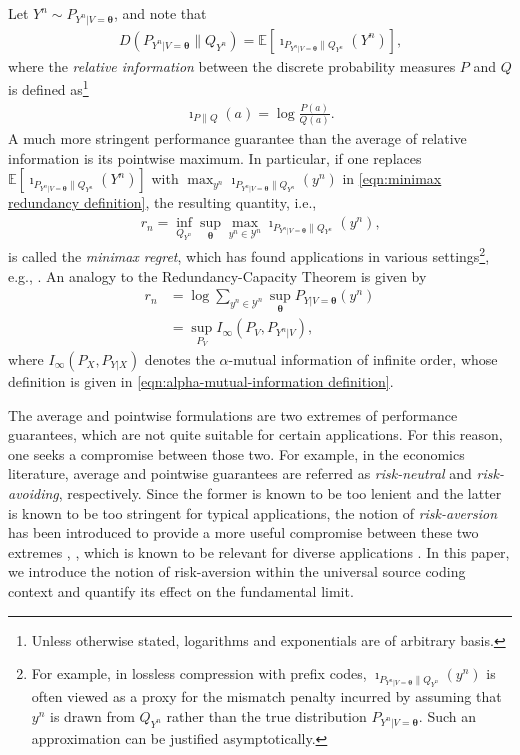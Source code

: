 \documentclass[journal, 10pt]{IEEEtran}
\newcommand{\bbE}{\mathbb{E}}
\newcommand{\cY}{\mathcal{Y}}
\theoremstyle{plain}
\theoremstyle{plain}
\theoremstyle{plain}
\theoremstyle{plain}
\newcommand{\boldtheta}{\mathbold{\theta}}
\begin{document}
Let $Y^n\sim P_{Y^n|V=\boldtheta}$, and note that
\begin{align}
	D(P_{Y^n|V=\boldtheta}\| Q_{Y^n} )=\bbE \left[\imath_{P_{Y^n|V=\boldtheta}\| Q_{Y^n} }(Y^n) \right]\text{,} 
\end{align}
where the \emph{relative information} between the discrete probability measures $P$ and $Q$ is defined as\footnote{Unless otherwise stated, logarithms and exponentials are of arbitrary basis.}
\begin{align}
\imath_{P\| Q }(a)=\log \frac{P(a)}{Q(a)}\text{.}
\end{align}
A much more stringent performance guarantee than the average of relative information is its pointwise maximum. In particular, if one replaces $\bbE[\imath_{P_{Y^n|V=\boldtheta}\| Q_{Y^n} }(Y^n) ]$ with $\max_{y^n} \imath_{P_{Y^n|V=\boldtheta}\| Q_{Y^n} }(y^n) $ in \eqref{eqn:minimax redundancy definition}, the resulting quantity, i.e.,
\begin{align}
	r_n=\inf_{Q_{Y^n} } \sup_{\boldtheta } \max_{y^n\in \cY^n} \imath_{P_{Y^n|V=\boldtheta}\| Q_{Y^n} }(y^n)\text{,} \label{eqn:minimax regret definition}
\end{align}
is called the \emph{minimax regret}, which has found applications in various settings\footnote{For example, in lossless compression with prefix codes, $\imath_{P_{Y^n|V=\boldtheta}\| Q_{Y^n} }(y^n)$ is often viewed as a proxy for the mismatch penalty incurred by assuming that $y^n$ is drawn from $Q_{Y^n}$ rather than the true distribution $P_{Y^n|V=\boldtheta}$. Such an approximation can be justified asymptotically.}, e.g., \cite{XieBarron2000, Shtarkov87, ForsterWarmuth2002, Dramota04, LiangBarron2004}. An analogy to the Redundancy-Capacity Theorem is given by \cite{Shtarkov87}
\begin{align}
r_n&= \log \sum_{y^n\in \cY^n} \sup_{\boldtheta} P_{Y|V=\boldtheta}(y^n)  \label{eqn:shtarkov sum} \\
&=\sup_{P_V}I_\infty(P_V, P_{Y^n|V})\text{,} \label{eqn:redundancy-capacity for Regret}
\end{align}
where $I_\infty(P_X, P_{Y|X})$ denotes the $\alpha$-mutual information of infinite order, whose definition is given in \eqref{eqn:alpha-mutual-information definition}.

The average and pointwise formulations are two extremes of performance guarantees, which are not quite suitable for certain applications. For this reason, one seeks a compromise between those two. For example, in the economics literature, average and pointwise guarantees are referred as \emph{risk-neutral} and \emph{risk-avoiding}, respectively. Since the former is known to be too lenient and the latter is known to be too stringent for typical applications, the notion of \emph{risk-aversion} has been introduced to provide a more useful compromise between these two extremes \cite{Pratt64}, \cite{Arrow65}, which is known to be relevant for diverse applications \cite{Ross81}. In this paper, we introduce the notion of risk-aversion within the universal source coding context and quantify its effect on the fundamental limit.
\end{document}
